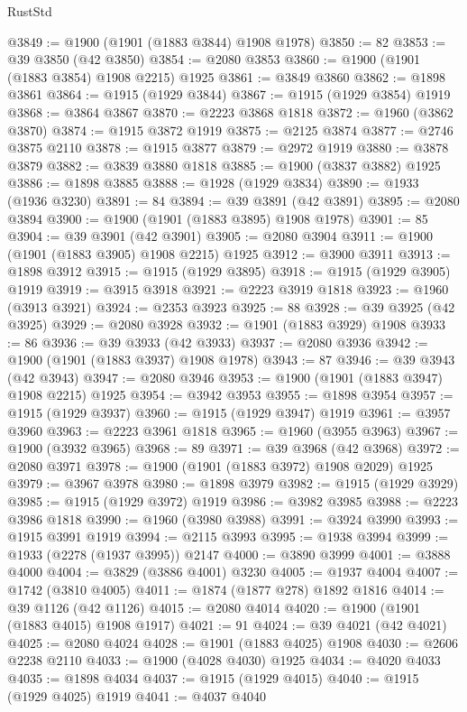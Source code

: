 \begin{lexlean}{RustStd}
\begin{coremodule}
@3849 := @1900 (@1901 (@1883 @3844) @1908 @1978)
@3850 := 82
@3853 := @39 @3850 (@42 @3850)
@3854 := @2080 @3853
@3860 := @1900 (@1901 (@1883 @3854) @1908 @2215) @1925
@3861 := @3849 @3860
@3862 := @1898 @3861
@3864 := @1915 (@1929 @3844)
@3867 := @1915 (@1929 @3854) @1919
@3868 := @3864 @3867
@3870 := @2223 @3868 @1818
@3872 := @1960 (@3862 @3870)
@3874 := @1915 @3872 @1919
@3875 := @2125 @3874
@3877 := @2746 @3875 @2110
@3878 := @1915 @3877
@3879 := @2972 @1919
@3880 := @3878 @3879
@3882 := @3839 @3880 @1818
@3885 := @1900 (@3837 @3882) @1925
@3886 := @1898 @3885
@3888 := @1928 (@1929 @3834)
@3890 := @1933 (@1936 @3230)
@3891 := 84
@3894 := @39 @3891 (@42 @3891)
@3895 := @2080 @3894
@3900 := @1900 (@1901 (@1883 @3895) @1908 @1978)
@3901 := 85
@3904 := @39 @3901 (@42 @3901)
@3905 := @2080 @3904
@3911 := @1900 (@1901 (@1883 @3905) @1908 @2215) @1925
@3912 := @3900 @3911
@3913 := @1898 @3912
@3915 := @1915 (@1929 @3895)
@3918 := @1915 (@1929 @3905) @1919
@3919 := @3915 @3918
@3921 := @2223 @3919 @1818
@3923 := @1960 (@3913 @3921)
@3924 := @2353 @3923
@3925 := 88
@3928 := @39 @3925 (@42 @3925)
@3929 := @2080 @3928
@3932 := @1901 (@1883 @3929) @1908
@3933 := 86
@3936 := @39 @3933 (@42 @3933)
@3937 := @2080 @3936
@3942 := @1900 (@1901 (@1883 @3937) @1908 @1978)
@3943 := 87
@3946 := @39 @3943 (@42 @3943)
@3947 := @2080 @3946
@3953 := @1900 (@1901 (@1883 @3947) @1908 @2215) @1925
@3954 := @3942 @3953
@3955 := @1898 @3954
@3957 := @1915 (@1929 @3937)
@3960 := @1915 (@1929 @3947) @1919
@3961 := @3957 @3960
@3963 := @2223 @3961 @1818
@3965 := @1960 (@3955 @3963)
@3967 := @1900 (@3932 @3965)
@3968 := 89
@3971 := @39 @3968 (@42 @3968)
@3972 := @2080 @3971
@3978 := @1900 (@1901 (@1883 @3972) @1908 @2029) @1925
@3979 := @3967 @3978
@3980 := @1898 @3979
@3982 := @1915 (@1929 @3929)
@3985 := @1915 (@1929 @3972) @1919
@3986 := @3982 @3985
@3988 := @2223 @3986 @1818
@3990 := @1960 (@3980 @3988)
@3991 := @3924 @3990
@3993 := @1915 @3991 @1919
@3994 := @2115 @3993
@3995 := @1938 @3994
@3999 := @1933 (@2278 (@1937 @3995)) @2147
@4000 := @3890 @3999
@4001 := @3888 @4000
@4004 := @3829 (@3886 @4001) @3230
@4005 := @1937 @4004
@4007 := @1742 (@3810 @4005)
@4011 := @1874 (@1877 @278) @1892 @1816
@4014 := @39 @1126 (@42 @1126)
@4015 := @2080 @4014
@4020 := @1900 (@1901 (@1883 @4015) @1908 @1917)
@4021 := 91
@4024 := @39 @4021 (@42 @4021)
@4025 := @2080 @4024
@4028 := @1901 (@1883 @4025) @1908
@4030 := @2606 @2238 @2110
@4033 := @1900 (@4028 @4030) @1925
@4034 := @4020 @4033
@4035 := @1898 @4034
@4037 := @1915 (@1929 @4015)
@4040 := @1915 (@1929 @4025) @1919
@4041 := @4037 @4040

\end{coremodule}
\end{lexlean}
